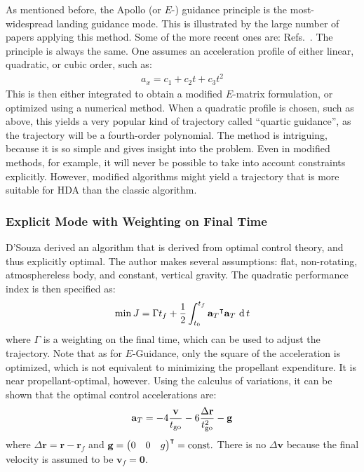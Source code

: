 \documentclass[%
]{aiaa-tc}
\begin{document}
As mentioned before, the Apollo (or $E$-) guidance principle is the
most-widespread landing guidance mode. This is illustrated by the large number
of papers applying this method. Some of the more recent ones are:
Refs.~. The principle is always the same. One assumes an acceleration
profile of either linear, quadratic, or cubic order, such as:
\begin{align}
	a_x = c_1 + c_2 t + c_3 t^2
\end{align}
This is then either integrated to obtain a modified $E$-matrix formulation, or
optimized using a numerical method. When a quadratic profile is chosen, such as
above, this yields a very popular kind of trajectory called ``quartic
guidance'', as the trajectory will be a fourth-order polynomial. The method is
intriguing, because it is so simple and gives insight into the problem.  
Even in modified methods, for example, it will never be possible to take into
account constraints explicitly. However, modified algorithms might yield a trajectory 
that is more suitable for HDA than the classic algorithm.


\subsubsection{Explicit Mode with Weighting on Final Time}

D'Souza derived an algorithm that is derived from optimal control
theory,\cite{Bryson1975} and thus explicitly optimal.\cite{DSouza1997} The
author makes several assumptions: flat, non-rotating, atmosphereless body, and
constant, vertical gravity. The quadratic performance index is then specified
as:
\begin{align}
	\min J = \Gamma t_f + \frac{1}{2} \int_{t_0}^{t_f} 
    {\mathbf{a}_T}^{\intercal} \mathbf{a}_T \, \operatorname{d} t
\end{align}
where $\Gamma$ is a weighting on the final time, which can be used to adjust the
trajectory. Note that as for $E$-Guidance, only the square of the acceleration
is optimized, which is not equivalent to minimizing the propellant expenditure.
It is near propellant-optimal, however.  Using the calculus of variations, it
can be shown that the optimal control accelerations are:
\begin{align}
	\mathbf{a}_T = -4 \frac{\mathbf{v}}{t_{\text{go}}}
	             -6 \frac{\Delta \mathbf{r}}{t_{\text{go}}^2}
	             -\mathbf{g}
\end{align}
where $\Delta \mathbf{r} = \mathbf{r} - \mathbf{r}_f$ and $\mathbf{g} =
{\left(\begin{matrix} 0 & 0 & g \end{matrix}\right)}^{\intercal} = \text{const.}$ There is no
$\Delta \mathbf{v}$ because the final velocity is assumed to be $\mathbf{v}_f =
\mathbf{0}$.
\end{document}
